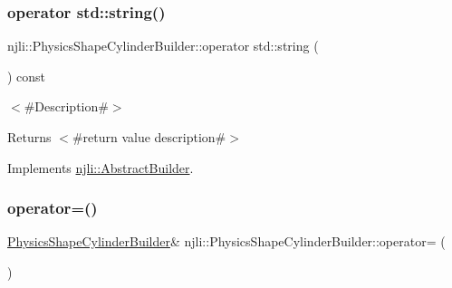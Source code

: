 \subsubsection{\texorpdfstring{operator std\+::string()}{operator std::string()}}
{\footnotesize\ttfamily njli\+::\+Physics\+Shape\+Cylinder\+Builder\+::operator std\+::string (\begin{DoxyParamCaption}{ }\end{DoxyParamCaption}) const\hspace{0.3cm}{\ttfamily [virtual]}}

$<$\#\+Description\#$>$

\begin{DoxyReturn}{Returns}
$<$\#return value description\#$>$ 
\end{DoxyReturn}


Implements \mbox{\hyperlink{classnjli_1_1_abstract_builder_a3e6e553e06d1ca30517ad5fb0bd4d000}{njli\+::\+Abstract\+Builder}}.

\mbox{\label{classnjli_1_1_physics_shape_cylinder_builder_a20d26cb7528ccc4e92a5cc16701993bb}} 
\subsubsection{\texorpdfstring{operator=()}{operator=()}}
{\footnotesize\ttfamily \mbox{\hyperlink{classnjli_1_1_physics_shape_cylinder_builder}{Physics\+Shape\+Cylinder\+Builder}}\& njli\+::\+Physics\+Shape\+Cylinder\+Builder\+::operator= (\begin{DoxyParamCaption}\item[{const \mbox{\hyperlink{classnjli_1_1_physics_shape_cylinder_builder}{Physics\+Shape\+Cylinder\+Builder}} \&}]{ }\end{DoxyParamCaption})\hspace{0.3cm}{\ttfamily [protected]}}

\mbox{\label{classnjli_1_1_physics_shape_cylinder_builder_a3f5771845a33f76782dfbf1a5b7db31c}} 

